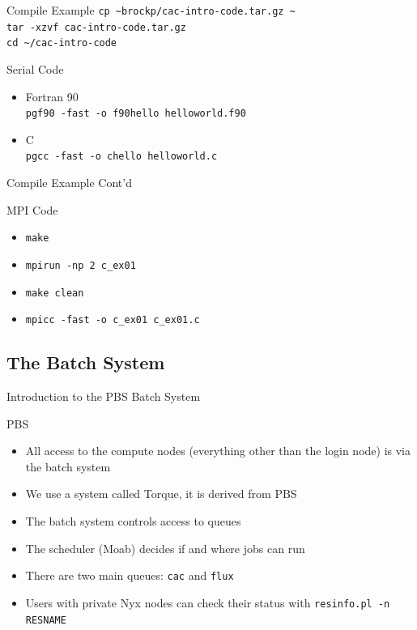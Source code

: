 \documentclass[handout]{beamer}
\begin{document}
\begin{frame}{Compile Example}
 \texttt{cp \~{}brockp/cac-intro-code.tar.gz \~{}} 
 \\ \texttt{tar -xzvf cac-intro-code.tar.gz}  \\ \texttt{cd \~{}/cac-intro-code}
 \begin{block}{Serial Code}
  \begin{itemize}
   \item Fortran 90
         \\ \texttt{pgf90 -fast -o f90hello helloworld.f90}
   \item C
         \\ \texttt{pgcc -fast -o chello helloworld.c}
  \end{itemize}
 \end{block}
\end{frame}
\begin{frame}{Compile Example Cont'd}
 \begin{block}{MPI Code}
  \begin{itemize}
   \item \texttt{make}
   \item \texttt{mpirun -np 2 c\_ex01}
   \item <2-> \texttt{make clean}
   \item <2-> \texttt{mpicc -fast -o c\_ex01 c\_ex01.c}
  \end{itemize}
 \end{block}
\end{frame}



  \subsection{The Batch System}
  \begin{frame}{Introduction to the PBS Batch System}
   \begin{block}{PBS}
    \begin{itemize}
    \item All access to the compute nodes (everything other than the login node)
      is via the batch system
    \item We use a system called Torque, it is derived from PBS
    \item The batch system controls access to queues
    \item The scheduler (Moab) decides if and where jobs can run
    \item<2-> There are two main queues: \texttt{cac} and \texttt{flux}
    \item<3-> Users with private Nyx nodes can check their status with \texttt{resinfo.pl -n RESNAME}
    \end{itemize}
   \end{block}
  \end{frame}
\end{document}
